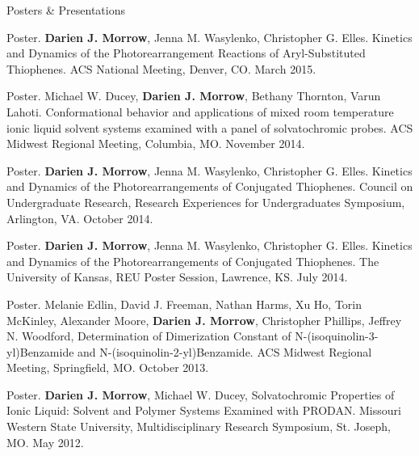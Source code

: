 \documentclass{resume} %
\begin{document}
\begin{rSection}{Posters \& Presentations}
	
	
\begin{etaremune}

	\item Poster. \textbf{Darien J. Morrow}, Jenna M. Wasylenko, Christopher G. Elles. Kinetics and
	Dynamics of the Photorearrangement Reactions of Aryl-Substituted Thiophenes. ACS National Meeting, Denver, CO. March 2015. 
	
	\item Poster. Michael W. Ducey, \textbf{Darien J. Morrow}, Bethany Thornton, Varun Lahoti. Conformational behavior and applications of mixed room temperature ionic liquid solvent systems examined with a panel of solvatochromic probes. ACS Midwest Regional Meeting, Columbia, MO. November 2014.
	
	\item Poster. \textbf{Darien J. Morrow}, Jenna M. Wasylenko, Christopher G. Elles. Kinetics and Dynamics of the Photorearrangements of Conjugated Thiophenes. Council on Undergraduate Research, Research Experiences for Undergraduates Symposium, Arlington, VA. October 2014.
	
	\item Poster. \textbf{Darien J. Morrow}, Jenna M. Wasylenko, Christopher G. Elles. Kinetics and 
	Dynamics of the Photorearrangements of Conjugated Thiophenes. The University of Kansas, REU Poster Session, Lawrence, KS. July 
	2014. 
	
	
	\item Poster. Melanie Edlin, David J. Freeman, Nathan Harms, Xu Ho, Torin McKinley, Alexander Moore, \textbf{Darien J. Morrow}, Christopher Phillips, Jeffrey N. Woodford, Determination of Dimerization Constant of N-(isoquinolin-3-yl)Benzamide and N-(isoquinolin-2-yl)Benzamide. ACS Midwest Regional Meeting, Springfield, MO. October 2013.
	
	\item Poster. \textbf{Darien J. Morrow}, Michael W. Ducey, Solvatochromic Properties of Ionic Liquid: Solvent and Polymer Systems Examined with PRODAN. Missouri Western State University, Multidisciplinary Research Symposium, St. Joseph, MO. May 2012.
	
\end{etaremune}
\end{rSection}
\end{document}
